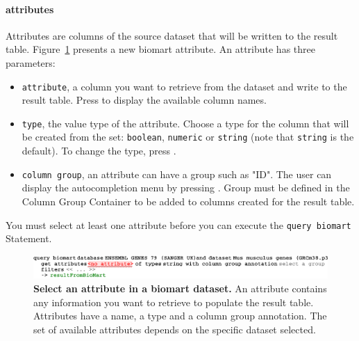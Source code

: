 \paragraph{attributes}
Attributes are columns of the source dataset that will be written to the result table. Figure~\ref{fig:attributeBiomart} presents a new biomart attribute. An attribute has three parameters:
\begin{itemize}

\item \texttt{attribute}, a column you want to retrieve from the dataset and write to the result table. Press \keys{\ctrl+\space} to display the available column names.
\item \texttt{type}, the value type of the attribute. Choose a type for the column that will be created from the set: \texttt{boolean}, \texttt{numeric} or \texttt{string} (note that \texttt{string} is the default). To change the type, press \keys{\ctrl+\space}.
\item \texttt{column group}, an attribute can have a group such as "ID". The user can display the autocompletion menu by pressing \keys{\ctrl+\space}. Group must be defined in the Column Group Container to be added to columns created for the result table.
\end{itemize}

\begin{remark}
You must select at least one attribute before you can execute the \texttt{query biomart} Statement.
\end{remark}

 \begin{figure}[h!tbp]
  \centering
  \includegraphics[width=\figWidthWide]{figures/BiomartAttribute.pdf}

\caption[Select an attribute in a biomart dataset.]{\textbf{Select an attribute in a biomart dataset.} An attribute contains any information you want to retrieve to populate the result table. Attributes have a name, a type and a column group annotation. The set of available attributes depends on the specific dataset selected.}
\label{fig:attributeBiomart}
\end{figure}
